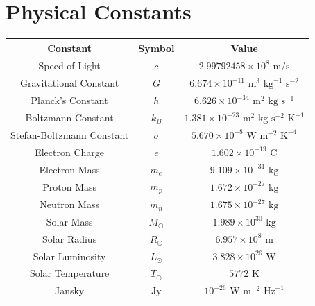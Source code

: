 \documentclass[a4paper,12pt]{article}
\numberwithin{equation}{section}
\begin{document}
\section*{Physical Constants}
\vspace*{\fill}
\begin{table}[H]
        \centering
        \begin{tabular}{|c|c|c|}
                \hline
                Constant & Symbol & Value \\
                \hline
                Speed of Light & $c$ & $2.99792458 \times 10^8 \text{ m/s}$ \\
                Gravitational Constant & $G$ & $6.674 \times 10^{-11} \text{ m}^3 \text{ kg}^{-1} \text{ s}^{-2}$ \\
                Planck's Constant & $h$ & $6.626 \times 10^{-34} \text{ m}^2 \text{ kg} \text{ s}^{-1}$ \\
                Boltzmann Constant & $k_B$ & $1.381 \times 10^{-23} \text{ m}^2 \text{ kg} \text{ s}^{-2} \text{ K}^{-1}$ \\
                Stefan-Boltzmann Constant & $\sigma$ & $5.670 \times 10^{-8} \text{ W} \text{ m}^{-2} \text{ K}^{-4}$ \\
                Electron Charge & $e$ & $1.602 \times 10^{-19} \text{ C}$ \\
                Electron Mass & $m_e$ & $9.109 \times 10^{-31} \text{ kg}$ \\
                Proton Mass & $m_p$ & $1.672 \times 10^{-27} \text{ kg}$ \\
                Neutron Mass & $m_n$ & $1.675 \times 10^{-27} \text{ kg}$ \\
                Solar Mass & $M_\odot$ & $1.989 \times 10^{30} \text{ kg}$ \\
                Solar Radius & $R_\odot$ & $6.957 \times 10^8 \text{ m}$ \\
                Solar Luminosity & $L_\odot$ & $3.828 \times 10^{26} \text{ W}$ \\
                Solar Temperature & $T_\odot$ & $5772 \text{ K}$ \\
                Jansky & Jy & $10^{-26} \text{ W} \text{ m}^{-2} \text{ Hz}^{-1}$ \\
                \hline
        \end{tabular}
\end{table}
\vspace*{\fill}

\newpage



% 


\newpage

\newpage
\printindex
\end{document}
